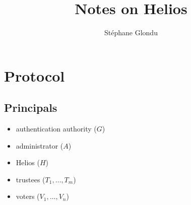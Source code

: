 \documentclass[a4paper]{article}
\title{Notes on Helios}
\author{Stéphane Glondu}
\begin{document}
\maketitle
\tableofcontents

\section{Protocol}

\subsection{Principals}
\begin{itemize}
\item authentication authority ($G$)
\item administrator ($A$)
\item Helios ($H$)
\item trustees ($T_1,\dots,T_m$)
\item voters ($V_1,\dots,V_n$)
\end{itemize}
\end{document}
